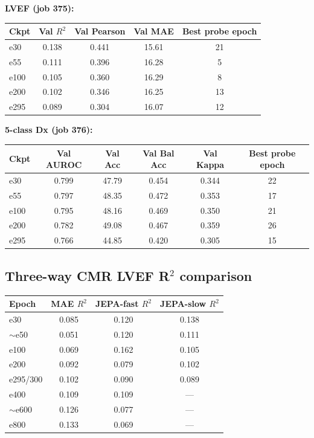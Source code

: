 \documentclass{article}
\begin{document}
\textbf{LVEF (job 375):}
\begin{center}
\begin{tabular}{lcccc}
\toprule
Ckpt & Val $R^2$ & Val Pearson & Val MAE & Best probe epoch \\
\midrule
e30  & 0.138 & 0.441 & 15.61 & 21 \\
e55  & 0.111 & 0.396 & 16.28 & 5 \\
e100 & 0.105 & 0.360 & 16.29 & 8 \\
e200 & 0.102 & 0.346 & 16.25 & 13 \\
e295 & 0.089 & 0.304 & 16.07 & 12 \\
\bottomrule
\end{tabular}
\end{center}

\textbf{5-class Dx (job 376):}
\begin{center}
\begin{tabular}{lccccc}
\toprule
Ckpt & Val AUROC & Val Acc & Val Bal Acc & Val Kappa & Best probe epoch \\
\midrule
e30  & 0.799 & 47.79 & 0.454 & 0.344 & 22 \\
e55  & 0.797 & 48.35 & 0.472 & 0.353 & 17 \\
e100 & 0.795 & 48.16 & 0.469 & 0.350 & 21 \\
e200 & 0.782 & 49.08 & 0.467 & 0.359 & 26 \\
e295 & 0.766 & 44.85 & 0.420 & 0.305 & 15 \\
\bottomrule
\end{tabular}
\end{center}

\subsection{Three-way CMR LVEF R$^2$ comparison}

\begin{center}
\begin{tabular}{lccc}
\toprule
Epoch & MAE $R^2$ & JEPA-fast $R^2$ & JEPA-slow $R^2$ \\
\midrule
e30 & 0.085 & 0.120 & 0.138 \\
$\sim$e50 & 0.051 & 0.120 & 0.111 \\
e100 & 0.069 & 0.162 & 0.105 \\
e200 & 0.092 & 0.079 & 0.102 \\
e295/300 & 0.102 & 0.090 & 0.089 \\
e400 & 0.109 & 0.109 & --- \\
$\sim$e600 & 0.126 & 0.077 & --- \\
e800 & 0.133 & 0.069 & --- \\
\bottomrule
\end{tabular}
\end{center}
\end{document}
